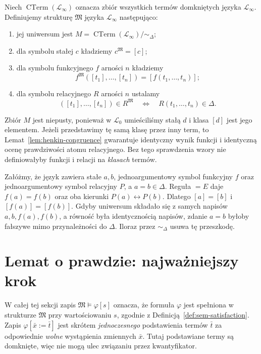 \begin{definicja}\label{def:henkin-term-model}
Niech $\operatorname{CTerm}(\mathcal L_{\infty})$ oznacza zbiór wszystkich termów domkniętych języka $\mathcal L_{\infty}$. Definiujemy strukturę $\mathfrak M$ języka $\mathcal L_{\infty}$ następująco:
\begin{enumerate}[label=(\roman*)]
\item jej uniwersum jest $M=\operatorname{CTerm}(\mathcal L_{\infty})/{\sim_{\Delta}}$;
\item dla symbolu stałej $c$ kładziemy $c^{\mathfrak M}=[c]$;
\item dla symbolu funkcyjnego $f$ arności $n$ kładziemy
\[
f^{\mathfrak M}([t_1],\ldots,[t_n])=[f(t_1,\ldots,t_n)];
\]
\item dla symbolu relacyjnego $R$ arności $n$ ustalamy
\[
([t_1],\ldots,[t_n])\in R^{\mathfrak M}
\quad\Longleftrightarrow\quad R(t_1,\ldots,t_n)\in\Delta.
\]
\end{enumerate}
\end{definicja}

\begin{uwaga}\label{rem:henkin-well-defined}
Zbiór $M$ jest niepusty, ponieważ w $\mathcal L_0$ umieściliśmy stałą $d$ i klasa $[d]$ jest jego elementem. Jeżeli przedstawimy tę samą klasę przez inny term, to Lemat~\ref{lem:henkin-congruence} gwarantuje identyczny wynik funkcji i identyczną ocenę prawdziwości atomu relacyjnego. Bez tego sprawdzenia wzory nie definiowałyby funkcji i relacji na \emph{klasach} termów.
\end{uwaga}

\begin{przyklad}
Załóżmy, że język zawiera stałe $a,b$, jednoargumentowy symbol funkcyjny $f$
oraz jednoargumentowy symbol relacyjny $P$, a $a=b\in\Delta$.
Reguła $=E$ daje $f(a)=f(b)$ oraz oba kierunki
$P(a)\leftrightarrow P(b)$. Dlatego $[a]=[b]$ i $[f(a)]=[f(b)]$.
Gdyby uniwersum składało się z samych napisów $a,b,f(a),f(b)$,
a równość była identycznością napisów, zdanie $a=b$ byłoby fałszywe
mimo przynależności do $\Delta$.
Iloraz przez $\sim_{\Delta}$ usuwa tę przeszkodę.
\end{przyklad}

\section{Lemat o prawdzie: najważniejszy krok}\label{sec:henkin-truth-lemma}
W całej tej sekcji zapis $\mathfrak M\models\varphi[s]$ oznacza,
że formuła $\varphi$ jest spełniona w strukturze $\mathfrak M$
przy wartościowaniu $s$, zgodnie z Definicją~\ref{def:sem-satisfaction}.
Zapis $\varphi[\bar x:=\bar t]$ jest skrótem \emph{jednoczesnego}
podstawienia termów $\bar t$ za odpowiednie \emph{wolne}
wystąpienia zmiennych $\bar x$. Tutaj podstawiane termy są domknięte,
więc nie mogą ulec związaniu przez kwantyfikator.


